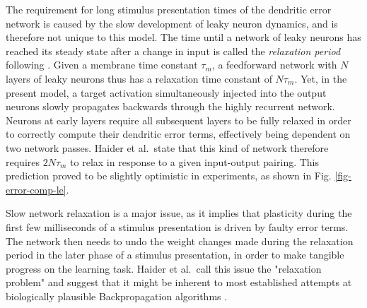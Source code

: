 The requirement for long stimulus presentation times of the dendritic error network is caused by the slow development of
leaky neuron dynamics, and is therefore not unique to this model. The time until a network of leaky neurons has reached
its steady state after a change in input is called the \textit{relaxation period} following \citep{Haider2021}. Given a
membrane time constant $\tau_m$, a feedforward network with $N$ layers of leaky neurons thus has a relaxation time
constant of $N \tau_m$. Yet, in the present model, a target activation simultaneously injected into the output neurons
slowly propagates backwards through the highly recurrent network. Neurons at early layers require all subsequent layers
to be fully relaxed in order to correctly compute their dendritic error terms, effectively being dependent on two
network passes. Haider et al.\ state that this kind of network therefore requires $2N\tau_m$ to relax in response to a
given input-output pairing. This prediction proved to be slightly optimistic in experiments, as shown in Fig.
\ref{fig-error-comp-le}.


Slow network relaxation is a major issue, as it implies that plasticity during the first few milliseconds of a stimulus
presentation is driven by faulty error terms. The network then needs to undo the weight changes made during the
relaxation period in the later phase of a stimulus presentation, in order to make tangible progress on the learning
task. Haider et al.\ call this issue the "relaxation problem" and suggest that it might be inherent to most established
attempts at biologically plausible Backpropagation algorithms
\citep{Whittington2017,guerguiev2017towards,sacramento2018dendritic,millidge2020activation}.



